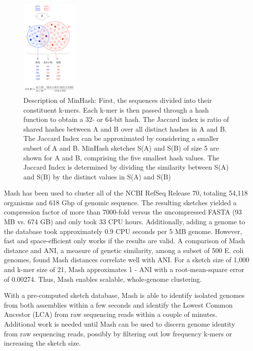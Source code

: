 \documentclass[12pt, letterpaper]{article}
\begin{document}
\begin{figure}
    \centering
    \includegraphics[width=0.25\textwidth]{Mash_description.png}
    \caption{Description of MinHash: First, the sequences divided into their constituent k-mers. Each k-mer is then passed through a hash function to obtain a 32- or 64-bit hash. The Jaccard index is ratio of shared hashes between A and B over all distinct hashes in A and B. The Jaccard Index can be approximated by considering a smaller subset of A and B. MinHash sketches S(A) and S(B) of size 5 are shown for A and B, comprising the five smallest hash values. The Jaccard Index is determined by dividing the similarity between S(A) and S(B) by the distinct values in S(A) and S(B)}
\label{fig:MinHashDescription}
\end{figure}

Mash has been used to cluster all of the NCBI RefSeq Release 70, totaling 54,118 organisms and 618 Gbp of genomic sequence. The resulting sketches yielded a compression factor of more than 7000-fold versus the uncompressed FASTA (93 MB vs. 674 GB) and only took 33 CPU hours. Additionally, adding a genome to the database took approximately 0.9 CPU seconds per 5 MB genome. However, fast and space-efficient only works if the results are valid. A comparison of Mash distance and ANI, a  measure of genetic similarity, among a subset of 500 E. coli genomes, found Mash distances correlate well with ANI. For a sketch size of 1,000 and k-mer size of 21, Mash approximates 1 - ANI with a root-mean-square error of 0.00274. Thus, Mash enables scalable, whole-genome clustering. 

With a pre-computed sketch database, Mash is able to identify isolated genomes from both assemblies within a few seconds and identify the Lowest Common Ancestor (LCA) from raw sequencing reads within a couple of minutes. Additional work is needed until Mash can be used to discern genome identity from raw sequencing reads, possibly by filtering out low frequency k-mers or increasing the sketch size.
\end{document}
